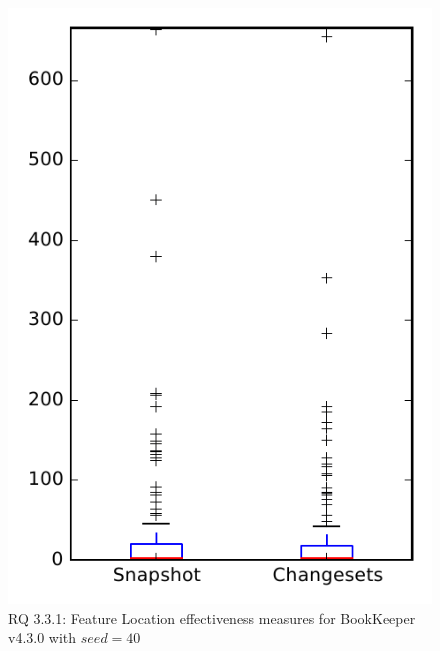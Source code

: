 
\begin{figure}
\centering
\includegraphics[height=0.4\textheight]{figures/flt_seed/rq1_bookkeeper_40}
\caption{RQ 3.3.1: Feature Location effectiveness measures for BookKeeper v4.3.0 with $seed=40$}
\label{fig:flt_seed:rq1:bookkeeper}
\end{figure}
